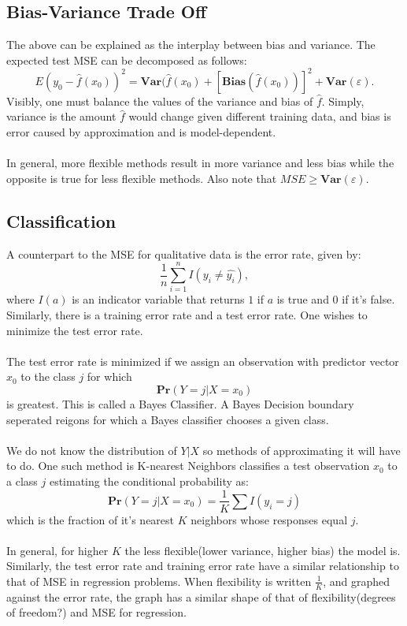 \documentclass[11pt]{article} %
\begin{document}
	\subsection{Bias-Variance Trade Off}
		The above can be explained as the interplay between bias and variance. The expected test MSE can be decomposed as follows:
		$$E(y_0 -\hat{f}(x_0))^2 = \mathbf{Var}(\hat{f}(x_0) + [\mathbf{Bias}(\hat{f}(x_0))]^2 +\mathbf{Var}(\varepsilon).$$
		Visibly, one must balance the values of the variance and bias of $\hat{f}$. Simply, variance is the amount $\hat{f}$ would change given different training data, and bias is error caused by approximation and is model-dependent. \\ \\
		In general, more flexible methods result in more variance and less bias while the opposite is true for less flexible methods. Also note that $MSE \geq \mathbf{Var}(\varepsilon).$
	\subsection{Classification}
		A counterpart to the MSE for qualitative data is the error rate, given by:
		$$\frac{1}{n} \sum_{i=1}^n I(y_i \neq \hat{y_i}),$$
		where $I(a)$ is an indicator variable that returns $1$ if $a$ is true and $0$ if it's false. Similarly, there is a training error rate and a test error rate. One wishes to minimize the test error rate. \\\\
		The test error rate is minimized if we assign an observation with predictor vector $x_0$ to the class $j$ for which
		$$\mathbf{Pr}(Y=j | X = x_0)$$
		is greatest. This is called a Bayes Classifier. A Bayes Decision boundary seperated reigons for which a Bayes classifier chooses a given class. \\\\
		We do not know the distribution of $Y|X$ so methods of approximating it will have to do. One such method is K-nearest Neighbors classifies a test observation $x_0$ to a class $j$ estimating the conditional probability as:
		$$\mathbf{Pr}(Y = j | X = x_0) = \frac{1}{K} \sum I(y_i = j)$$
		which is the fraction of it's nearest $K$ neighbors whose responses equal $j$. \\\\
		In general, for higher $K$ the less flexible(lower variance, higher bias) the model is. Similarly, the test error rate and training error rate have a similar relationship to that of MSE in regression problems. When flexibility is written $\frac{1}{K}$, and graphed against the error rate, the graph has a similar shape of that of flexibility(degrees of freedom?) and MSE for regression.
		
\end{document}
